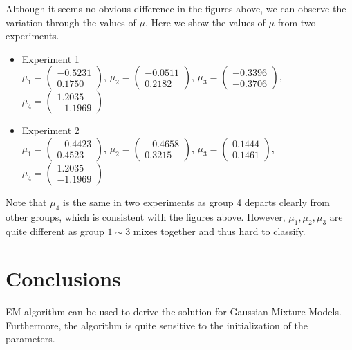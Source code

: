 \documentclass{article}
\begin{document}
\begin{spacing}{1.5}
Although it seems no obvious difference in the figures above, we can observe the variation through the values of $\mu$. Here we show the values of $\mu$ from two experiments.
\begin{itemize}
	\item Experiment 1 \\
	$\mu_1=  \left(
  \begin{array}{c}
          -0.5231 \\
          0.1750
 \end{array}
 \right)$,
$\mu_2=  \left(
  \begin{array}{c}
         -0.0511 \\
          0.2182
 \end{array}
 \right)$, 
$\mu_3=  \left(
  \begin{array}{c}
          -0.3396 \\
          -0.3706
 \end{array}
 \right)$,
$\mu_4=  \left(
  \begin{array}{c}
          1.2035 \\
          -1.1969
 \end{array}
 \right)$ 
 	\item Experiment 2\\
 	$\mu_1=  \left(
  \begin{array}{c}
          -0.4423 \\
          0.4523
 \end{array}
 \right)$,
$\mu_2=  \left(
  \begin{array}{c}
         -0.4658 \\
          0.3215
 \end{array}
 \right)$, 
$\mu_3=  \left(
  \begin{array}{c}
          0.1444 \\
          0.1461
 \end{array}
 \right)$,
$\mu_4=  \left(
  \begin{array}{c}
          1.2035 \\
          -1.1969
 \end{array}
 \right)$ 
\end{itemize}

Note that $\mu_4$ is the same in two experiments as group 4 departs clearly from other groups, which is consistent with the figures above. However, $\mu_1, \mu_2, \mu_3$ are quite different as group $1 \sim 3$ mixes together and thus hard to classify.


\section{Conclusions}
EM algorithm can be used to derive the solution for Gaussian Mixture Models. Furthermore, the algorithm is quite sensitive to the initialization of the parameters.

\end{spacing}
\end{document}
